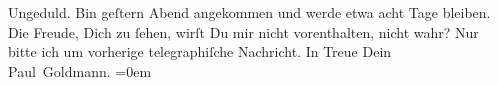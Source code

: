 \begin{ledgroupsized}[t]{13cm}
               Ungeduld. Bin geſtern{ }Abend angekommen und werde etwa acht Tage bleiben. Die Freude, Dich zu
               ſehen, wirſt Du mir nicht vorenthalten, nicht wahr? Nur bitte ich um vorherige
               telegraphiſche Nachricht. In Treue\pend
           \pstart
           Dein {\\[\baselineskip]}\spacefill\mbox{Paul Goldmann.}\pend
           \leftskip=0em{}\endnumbering{}\end{ledgroupsized}\begin{anhang}\end{anhang}\newcommand{\dateiname}{L02715}\newcommand{\titel}{Paul Goldmann an Arthur Schnitzler, 12. 9. [1893]}\newcommand{\editorInnen}{Martin Anton Müller und Laura Untner}
      